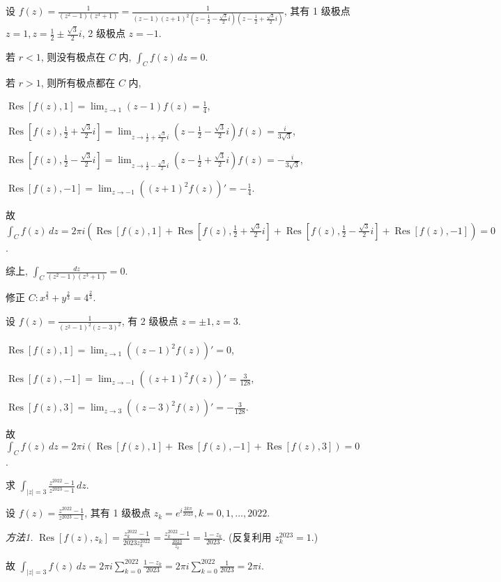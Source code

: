 \documentclass{homework}
\DeclareMathOperator\Res{Res}
\begin{document}
设 \(f(z)=\frac{1}{(z^2-1)(z^3+1)}=\frac{1}{(z-1)(z+1)^2(z-\frac{1}{2}-\frac{\sqrt{3}}{2}i)(z-\frac{1}{2}+\frac{\sqrt{3}}{2}i)}\), 其有 1 级极点 \(z=1, z=\frac{1}{2}\pm\frac{\sqrt{3}}{2}i\), 2 级极点 \(z=-1\).

若 \(r<1\), 则没有极点在 \(C\) 内, \(\int_Cf(z)\,dz=0\).

若 \(r>1\), 则所有极点都在 \(C\) 内,

\(\Res[f(z), 1]=\lim_{z\to1}(z-1)f(z)=\frac{1}{4}\),

\(\Res[f(z), \frac{1}{2}+\frac{\sqrt{3}}{2}i]=\lim_{z\to\frac{1}{2}+\frac{\sqrt{3}}{2}i}(z-\frac{1}{2}-\frac{\sqrt{3}}{2}i)f(z)=\frac{i}{3\sqrt{3}}\),

\(\Res[f(z), \frac{1}{2}-\frac{\sqrt{3}}{2}i]=\lim_{z\to\frac{1}{2}-\frac{\sqrt{3}}{2}i}(z-\frac{1}{2}+\frac{\sqrt{3}}{2}i)f(z)=-\frac{i}{3\sqrt{3}}\),

\(\Res[f(z), -1]=\lim_{z\to-1}((z+1)^2f(z))'=-\frac{1}{4}\).

故 \(\int_Cf(z)\,dz=2\pi i(\Res[f(z), 1]+\Res[f(z), \frac{1}{2}+\frac{\sqrt{3}}{2}i]+\Res[f(z), \frac{1}{2}-\frac{\sqrt{3}}{2}i]+\Res[f(z), -1])=0\).

综上, \(\int_C\frac{dz}{(z^2-1)(z^3+1)}=0\).

修正 \(C: x^{\frac{2}{3}}+y^{\frac{2}{3}}=4^\frac{2}{3}\).

设 \(f(z)=\frac{1}{(z^2-1)^2(z-3)^2}\), 有 2 级极点 \(z=\pm1, z=3\).

\(\Res[f(z), 1]=\lim_{z\to1}((z-1)^2f(z))'=0\),

\(\Res[f(z), -1]=\lim_{z\to-1}((z+1)^2f(z))'=\frac{3}{128}\),

\(\Res[f(z), 3]=\lim_{z\to3}((z-3)^2f(z))'=-\frac{3}{128}\).

故 \(\int_Cf(z)\,dz=2\pi i(\Res[f(z), 1]+\Res[f(z), -1]+\Res[f(z), 3])=0\).

\begin{center}
\end{center}

求 \(\int_{|z|=3}\frac{z^{2022}-1}{z^{2023}-1}\,dz\).

设 \(f(z)=\frac{z^{2022}-1}{z^{2023}-1}\), 其有 1 级极点 \(z_k=e^{i\frac{2k\pi}{2023}}, k=0,1,\dots,2022\).

\textit{方法1.} \(\Res[f(z), z_k]=\frac{z_k^{2022}-1}{2023z_k^{2022}}=\frac{z_k^{2022}-1}{\frac{2023}{z_k}}=\frac{1-z_k}{2023}\). (反复利用 \(z_k^{2023}=1\).)

故 \(\int_{|z|=3}f(z)\,dz=2\pi i\sum_{k=0}^{2022}\frac{1-z_k}{2023}=2\pi i\sum_{k=0}^{2022}\frac{1}{2023}=2\pi i\).
\end{document}
